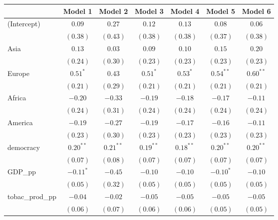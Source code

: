
\begin{table}[!h]
\begin{center}
\begin{tabular}{l c c c c c c }
\toprule
 & Model 1 & Model 2 & Model 3 & Model 4 & Model 5 & Model 6 \\
\midrule
(Intercept)             & $0.09$      & $0.27$      & $0.12$      & $0.13$      & $0.08$      & $0.06$      \\
                        & $(0.38)$    & $(0.43)$    & $(0.38)$    & $(0.38)$    & $(0.37)$    & $(0.38)$    \\
Asia                    & $0.13$      & $0.03$      & $0.09$      & $0.10$      & $0.15$      & $0.20$      \\
                        & $(0.24)$    & $(0.30)$    & $(0.23)$    & $(0.23)$    & $(0.23)$    & $(0.23)$    \\
Europe                  & $0.51^{*}$  & $0.43$      & $0.51^{*}$  & $0.53^{*}$  & $0.54^{**}$ & $0.60^{**}$ \\
                        & $(0.21)$    & $(0.29)$    & $(0.21)$    & $(0.21)$    & $(0.21)$    & $(0.21)$    \\
Africa                  & $-0.20$     & $-0.33$     & $-0.19$     & $-0.18$     & $-0.17$     & $-0.11$     \\
                        & $(0.24)$    & $(0.31)$    & $(0.24)$    & $(0.24)$    & $(0.24)$    & $(0.24)$    \\
America                 & $-0.19$     & $-0.27$     & $-0.19$     & $-0.17$     & $-0.16$     & $-0.11$     \\
                        & $(0.23)$    & $(0.30)$    & $(0.23)$    & $(0.23)$    & $(0.23)$    & $(0.23)$    \\
democracy               & $0.20^{**}$ & $0.21^{**}$ & $0.19^{**}$ & $0.18^{**}$ & $0.20^{**}$ & $0.20^{**}$ \\
                        & $(0.07)$    & $(0.08)$    & $(0.07)$    & $(0.07)$    & $(0.07)$    & $(0.07)$    \\
GDP\_pp                 & $-0.11^{*}$ & $-0.45$     & $-0.10$     & $-0.10$     & $-0.10^{*}$ & $-0.10$     \\
                        & $(0.05)$    & $(0.32)$    & $(0.05)$    & $(0.05)$    & $(0.05)$    & $(0.05)$    \\
tobac\_prod\_pp         & $-0.04$     & $-0.02$     & $-0.05$     & $-0.05$     & $-0.05$     & $-0.05$     \\
                        & $(0.06)$    & $(0.07)$    & $(0.06)$    & $(0.06)$    & $(0.05)$    & $(0.05)$    \\

\end{tabular}
\end{center}
\end{table}
